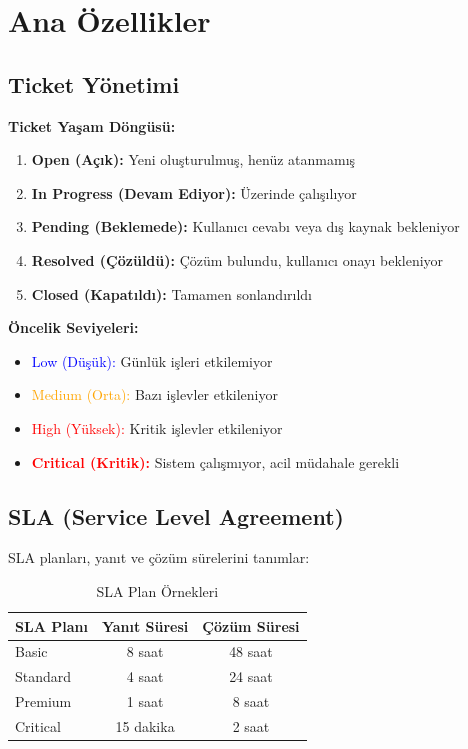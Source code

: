 \documentclass[12pt,a4paper]{article}
\begin{document}
\newpage

\section{Ana Özellikler}

\subsection{Ticket Yönetimi}

\textbf{Ticket Yaşam Döngüsü:}

\begin{enumerate}
    \item \textbf{Open (Açık):} Yeni oluşturulmuş, henüz atanmamış
    \item \textbf{In Progress (Devam Ediyor):} Üzerinde çalışılıyor
    \item \textbf{Pending (Beklemede):} Kullanıcı cevabı veya dış kaynak bekleniyor
    \item \textbf{Resolved (Çözüldü):} Çözüm bulundu, kullanıcı onayı bekleniyor
    \item \textbf{Closed (Kapatıldı):} Tamamen sonlandırıldı
\end{enumerate}

\textbf{Öncelik Seviyeleri:}

\begin{itemize}
    \item \textcolor{blue}{Low (Düşük):} Günlük işleri etkilemiyor
    \item \textcolor{orange}{Medium (Orta):} Bazı işlevler etkileniyor
    \item \textcolor{red}{High (Yüksek):} Kritik işlevler etkileniyor
    \item \textcolor{red}{\textbf{Critical (Kritik):}} Sistem çalışmıyor, acil müdahale gerekli
\end{itemize}

\subsection{SLA (Service Level Agreement)}

SLA planları, yanıt ve çözüm sürelerini tanımlar:

\begin{table}[h]
\centering
\begin{tabular}{|l|c|c|}
\hline
\textbf{SLA Planı} & \textbf{Yanıt Süresi} & \textbf{Çözüm Süresi} \\
\hline
Basic & 8 saat & 48 saat \\
Standard & 4 saat & 24 saat \\
Premium & 1 saat & 8 saat \\
Critical & 15 dakika & 2 saat \\
\hline
\end{tabular}
\caption{SLA Plan Örnekleri}
\end{table}
\end{document}
